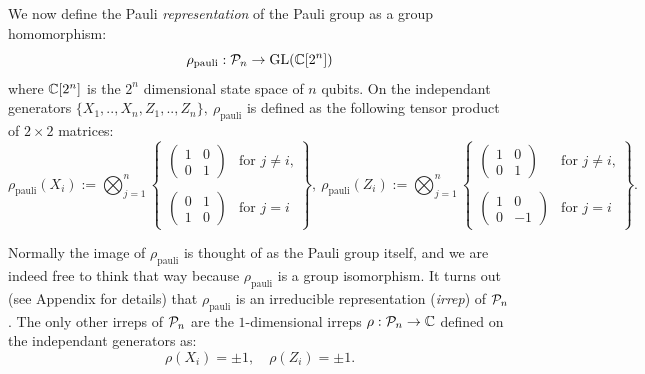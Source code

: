 \documentclass[12pt,notitlepage,longbibliography,nofootinbib,tightenlines]{revtex4}
\begin{document}
We now define the
Pauli {\it representation} 
of the Pauli group as a group homomorphism:
$$
    \rho_{\mathrm{pauli}} : \mathcal{P}_n \to \mathrm{GL}(\mathbb{C}[2^n])
$$
where $\mathbb{C}[2^n]$ is the $2^n$ dimensional state space of $n$ qubits.
On the independant generators 
$\{X_1, .., X_n, Z_1, .., Z_n\},\ \rho_{\mathrm{pauli}}$
is defined as the following tensor product of $2\times 2$ matrices:
$$
\rho_{\mathrm{pauli}}(X_i) := \bigotimes_{j=1}^n \left\{ \begin{array}{ll}
\left( \begin{array}{ll}
1&0\\
0&1\end{array} \right) &\mbox{for $j\ne i$,}\\
\\
\left( \begin{array}{ll}
0&1\\
1&0\end{array} \right) &\mbox{for $j=i$} \end{array}
\right\},\ 
\rho_{\mathrm{pauli}}(Z_i) := \bigotimes_{j=1}^n \left\{ \begin{array}{ll}
\left( \begin{array}{ll}
1&0\\
0&1\end{array} \right) &\mbox{for $j\ne i$,}\\
\\
\left( \begin{array}{rr}
1&0\\
0&-1\end{array} \right) &\mbox{for $j=i$}\end{array}
\right\}.
$$


Normally the image of 
$\rho_{\mathrm{pauli}}$ is thought of as the
Pauli group itself, and we are indeed free to think
that way because $\rho_{\mathrm{pauli}}$ is a group
isomorphism.
It turns out (see Appendix for details)
that $\rho_{\mathrm{pauli}}$ is an
irreducible representation ({\it irrep}) of $\mathcal{P}_n$. 
The only other irreps of $\mathcal{P}_n$ are 
the $1$-dimensional irreps $\rho:\mathcal{P}_n\to\mathbb{C}$
defined on the independant generators as:
    $$ \rho(X_i) = \pm 1,\quad \rho(Z_i) = \pm 1.$$
\end{document}
